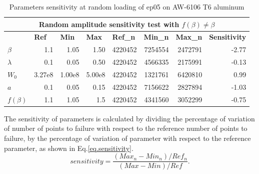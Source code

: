 \begin{table}[!h]
\centering
\begin{tabular}{lrrrrrrr}
\hline
\multicolumn{8}{c}{\textbf{Random amplitude sensitivity test with $f(\beta)\neq\beta$}}                                                                                                                                                                                                   \\ \hline
\textbf{}           & \multicolumn{1}{l}{\textbf{Ref}} & \multicolumn{1}{l}{\textbf{Min}} & \multicolumn{1}{l}{\textbf{Max}} & \multicolumn{1}{l}{\textbf{Ref\_n}} & \multicolumn{1}{l}{\textbf{Min\_n}} & \multicolumn{1}{l}{\textbf{Max\_n}} & \multicolumn{1}{l}{\textbf{Sensitivity}} \\ \hline
\textbf{$\beta$}    & 1.1                              & 1.05                             & 1.50                             & 4220452                             & 7254554                             & 2472791                             & -2.77                                    \\
\textbf{$\lambda$}  & 0.1                              & 0.05                             & 0.50                             & 4220452                             & 4566335                             & 2175991                             & -0.13                                    \\
\textbf{$W_0$}      & 3.27e8                         & 1.00e8                         & 5.00e8                         & 4220452                             & 1321761                             & 6420810                             & 0.99                                     \\
\textbf{$a$}        & 0.1                              & 0.05                             & 0.15                             & 4220452                             & 7156622                             & 2827894                             & -1.03                                    \\
\textbf{$f(\beta)$} & 1.1                              & 1.05                             & 1.5                              & 4220452                             & 4341560                             & 3052299                             & -0.75                                    \\ \hline
\end{tabular}
\caption{Parameters sensitivity at random loading of ep05 on AW-6106 T6 aluminum}
\label{tab.sensitivity_random2}
\end{table}
The sensitivity of parameters is calculated by dividing the percentage of variation of  number of points to failure with respect to the reference number of points to failure, by the percentage of variation of parameter with respect to the reference parameter, as shown in Eq.\eqref{eq.sensitivity}.
\begin{equation}
sensitivity = \dfrac{\left( Max_n-Min_n\right)/Ref_n}{\left( Max-Min\right)/Ref}.
\label{eq.sensitivity}
\end{equation}



